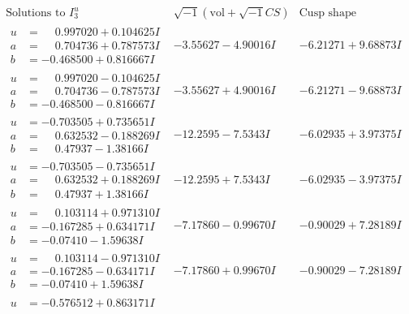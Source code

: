 \documentclass[1p]{elsarticle_modified}
\theoremstyle{definition}
\newcommand{\I}{\sqrt{-1}}
\begin{document}
$$\begin{array}{c|c|c}  
\text{Solutions to }I^u_{3}& \I (\text{vol} + \sqrt{-1}CS) & \text{Cusp shape}\\
 \hline 
\begin{aligned}
u &= \phantom{-}0.997020 + 0.104625 I \\
a &= \phantom{-}0.704736 + 0.787573 I \\
b &= -0.468500 + 0.816667 I\end{aligned}
 & -3.55627 - 4.90016 I & -6.21271 + 9.68873 I \\ \hline\begin{aligned}
u &= \phantom{-}0.997020 - 0.104625 I \\
a &= \phantom{-}0.704736 - 0.787573 I \\
b &= -0.468500 - 0.816667 I\end{aligned}
 & -3.55627 + 4.90016 I & -6.21271 - 9.68873 I \\ \hline\begin{aligned}
u &= -0.703505 + 0.735651 I \\
a &= \phantom{-}0.632532 - 0.188269 I \\
b &= \phantom{-}0.47937 - 1.38166 I\end{aligned}
 & -12.2595 - 7.5343 I & -6.02935 + 3.97375 I \\ \hline\begin{aligned}
u &= -0.703505 - 0.735651 I \\
a &= \phantom{-}0.632532 + 0.188269 I \\
b &= \phantom{-}0.47937 + 1.38166 I\end{aligned}
 & -12.2595 + 7.5343 I & -6.02935 - 3.97375 I \\ \hline\begin{aligned}
u &= \phantom{-}0.103114 + 0.971310 I \\
a &= -0.167285 + 0.634171 I \\
b &= -0.07410 - 1.59638 I\end{aligned}
 & -7.17860 - 0.99670 I & -0.90029 + 7.28189 I \\ \hline\begin{aligned}
u &= \phantom{-}0.103114 - 0.971310 I \\
a &= -0.167285 - 0.634171 I \\
b &= -0.07410 + 1.59638 I\end{aligned}
 & -7.17860 + 0.99670 I & -0.90029 - 7.28189 I \\ \hline\begin{aligned}
u &= -0.576512 + 0.863171 I \\

\end{aligned}
\end{array}$$
\end{document}
